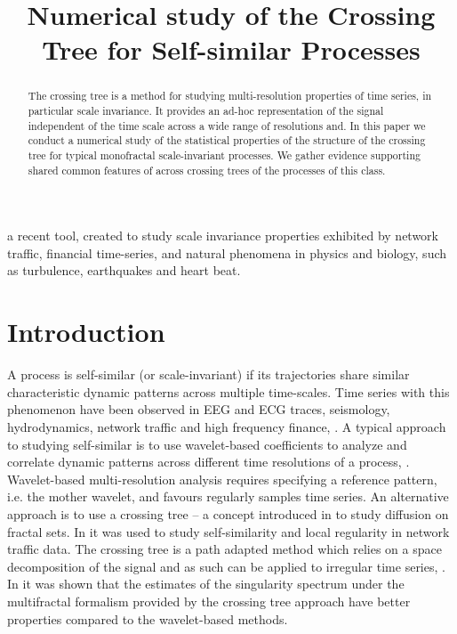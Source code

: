 \documentclass[a4paper]{article}
\title{Numerical study of the Crossing Tree for Self-similar Processes}
\begin{document}
\maketitle

\begin{abstract}
The crossing tree is a method for studying multi-resolution properties of time series,
in particular scale invariance. It provides an ad-hoc representation of the signal
independent of the time scale across a wide range of resolutions and. In this paper
we conduct a numerical study of the statistical properties of the structure of the
crossing tree for typical monofractal scale-invariant processes. We gather evidence
supporting shared common features of across crossing trees of the processes of this
class.
\end{abstract}


 a recent tool, created to study scale invariance properties
exhibited by network traffic, financial time-series, and natural phenomena in physics
and biology, such as turbulence, earthquakes and heart beat.

\section{Introduction} %
\label{sec:introduction}

A process is self-similar (or scale-invariant) if its trajectories share similar
characteristic dynamic patterns across multiple time-scales. Time series with this
phenomenon have been observed in EEG and ECG traces, seismology, hydrodynamics,
network traffic and high frequency finance, \cite{}.
A typical approach to studying self-similar is to use wavelet-based coefficients
to analyze and correlate dynamic patterns across different time resolutions of a
process, \cite{Jaffard2007}. Wavelet-based multi-resolution analysis requires specifying
a reference pattern, i.e. the mother wavelet, and favours regularly samples time
series. An alternative approach is to use a crossing tree -- a concept introduced
in \cite{BarlowPerkins88} to study diffusion on fractal sets. In \cite{jones2004}
it was used to study self-similarity and local regularity in network traffic data.
The crossing tree is a path adapted method which relies on a space decomposition
of the signal and as such can be applied to irregular time series, \cite{decrouez2013}.
In \cite{decrouez2015} it was shown that the estimates of the singularity spectrum
under the multifractal formalism provided by the crossing tree approach have better
properties compared to the wavelet-based methods.
\end{document}
